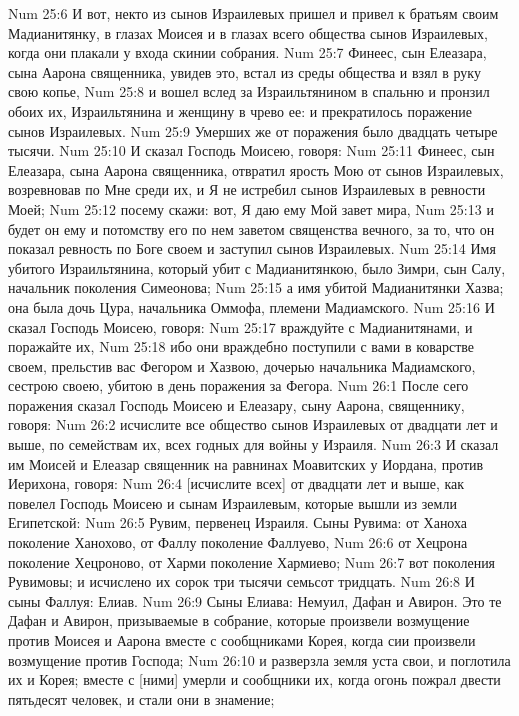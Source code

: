 Num 25:6  И вот, некто из сынов Израилевых пришел и привел к братьям своим Мадианитянку, в глазах Моисея и в глазах всего общества сынов Израилевых, когда они плакали у входа скинии собрания.
Num 25:7  Финеес, сын Елеазара, сына Аарона священника, увидев это, встал из среды общества и взял в руку свою копье,
Num 25:8  и вошел вслед за Израильтянином в спальню и пронзил обоих их, Израильтянина и женщину в чрево ее: и прекратилось поражение сынов Израилевых.
Num 25:9  Умерших же от поражения было двадцать четыре тысячи.
Num 25:10  И сказал Господь Моисею, говоря:
Num 25:11  Финеес, сын Елеазара, сына Аарона священника, отвратил ярость Мою от сынов Израилевых, возревновав по Мне среди их, и Я не истребил сынов Израилевых в ревности Моей;
Num 25:12  посему скажи: вот, Я даю ему Мой завет мира,
Num 25:13  и будет он ему и потомству его по нем заветом священства вечного, за то, что он показал ревность по Боге своем и заступил сынов Израилевых.
Num 25:14  Имя убитого Израильтянина, который убит с Мадианитянкою, было Зимри, сын Салу, начальник поколения Симеонова;
Num 25:15  а имя убитой Мадианитянки Хазва; она была дочь Цура, начальника Оммофа, племени Мадиамского.
Num 25:16  И сказал Господь Моисею, говоря:
Num 25:17  враждуйте с Мадианитянами, и поражайте их,
Num 25:18  ибо они враждебно поступили с вами в коварстве своем, прельстив вас Фегором и Хазвою, дочерью начальника Мадиамского, сестрою своею, убитою в день поражения за Фегора.
Num 26:1  После сего поражения сказал Господь Моисею и Елеазару, сыну Аарона, священнику, говоря:
Num 26:2  исчислите все общество сынов Израилевых от двадцати лет и выше, по семействам их, всех годных для войны у Израиля.
Num 26:3  И сказал им Моисей и Елеазар священник на равнинах Моавитских у Иордана, против Иерихона, говоря:
Num 26:4  [исчислите всех] от двадцати лет и выше, как повелел Господь Моисею и сынам Израилевым, которые вышли из земли Египетской:
Num 26:5  Рувим, первенец Израиля. Сыны Рувима: от Ханоха поколение Ханохово, от Фаллу поколение Фаллуево,
Num 26:6  от Хецрона поколение Хецроново, от Харми поколение Хармиево;
Num 26:7  вот поколения Рувимовы; и исчислено их сорок три тысячи семьсот тридцать.
Num 26:8  И сыны Фаллуя: Елиав.
Num 26:9  Сыны Елиава: Немуил, Дафан и Авирон. Это те Дафан и Авирон, призываемые в собрание, которые произвели возмущение против Моисея и Аарона вместе с сообщниками Корея, когда сии произвели возмущение против Господа;
Num 26:10  и разверзла земля уста свои, и поглотила их и Корея; вместе с [ними] умерли и сообщники их, когда огонь пожрал двести пятьдесят человек, и стали они в знамение;
